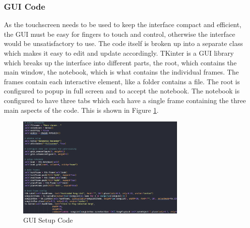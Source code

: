 \documentclass[UTF8, 12pt]{article}
\begin{document}
\subsubsection{GUI Code}
    As the touchscreen needs to be used to keep the interface compact and efficient, the GUI must be easy for fingers to touch and control, otherwise the interface would be unsatisfactory to use. The code itself is broken up into a separate class which makes it easy to edit and update accordingly. TKinter is a GUI library which breaks up the interface into different parts, the root, which contains the main window, the notebook, which is what contains the individual frames. The frames contain each interactive element, like a folder contains a file. The root is configured to popup in full screen and to accept the notebook. The notebook is configured to have three tabs which each have a single frame containing the three main aspects of the code. This is shown in Figure \ref{gui_fig}.
    \begin{figure}[h]
        \centering
        \includegraphics[width=0.75\textwidth]{gui_example}
        \caption{GUI Setup Code}
        \label{gui_fig}
    \end{figure}
\end{document}
